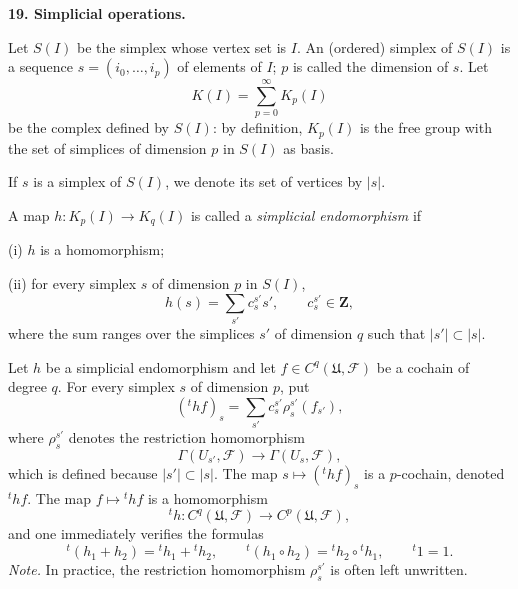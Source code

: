 
\medskip
{}\label{fac:I:3:no:19}
\textbf{19. Simplicial operations.}

Let $S(I)$ be the simplex whose vertex set is $I$. An (ordered) simplex of $S(I)$ is a sequence $s=(i_0,\ldots,i_p)$ of elements of $I$; $p$ is called the dimension of $s$. Let
\[
K(I)=\sum_{p=0}^{\infty}K_p(I)
\]
be the complex defined by $S(I)$: by definition, $K_p(I)$ is the free group with the set of simplices of dimension $p$ in $S(I)$ as basis.

If $s$ is a simplex of $S(I)$, we denote its set of vertices by $|s|$.

A map $h:K_p(I)\to K_q(I)$ is called a \textit{simplicial endomorphism} if

\label{fac:I:3:no:19:simplicial-endomorphism:item:i}(i) $h$ is a homomorphism;

\label{fac:I:3:no:19:simplicial-endomorphism:item:ii}(ii) for every simplex $s$ of dimension $p$ in $S(I)$,
\[
h(s)=\sum_{s'}c_s^{s'}s',\qquad c_s^{s'}\in\mathbf{Z},
\]
where the sum ranges over the simplices $s'$ of dimension $q$ such that $|s'|\subset|s|$.

Let $h$ be a simplicial endomorphism and let $f\in C^q(\mathfrak{U},\mathcal{F})$ be a cochain of degree $q$. For every simplex $s$ of dimension $p$, put
\[
({}^{t}hf)_s=\sum_{s'}c_s^{s'}\rho_s^{s'}(f_{s'}),
\]
where $\rho_s^{s'}$ denotes the restriction homomorphism
\[
\Gamma(U_{s'},\mathcal{F})\longrightarrow\Gamma(U_s,\mathcal{F}),
\]
which is defined because $|s'|\subset|s|$. The map $s\mapsto({}^{t}hf)_s$ is a $p$-cochain, denoted ${}^{t}hf$. The map $f\mapsto{}^{t}hf$ is a homomorphism
\[
{}^{t}h:C^q(\mathfrak{U},\mathcal{F})\longrightarrow C^p(\mathfrak{U},\mathcal{F}),
\]
and one immediately verifies the formulas
\[
{}^{t}(h_1+h_2)={}^{t}h_1+{}^{t}h_2,\qquad
{}^{t}(h_1\circ h_2)={}^{t}h_2\circ{}^{t}h_1,\qquad
{}^{t}1=1.
\]
\textit{Note.} In practice, the restriction homomorphism $\rho_s^{s'}$ is often left unwritten.

